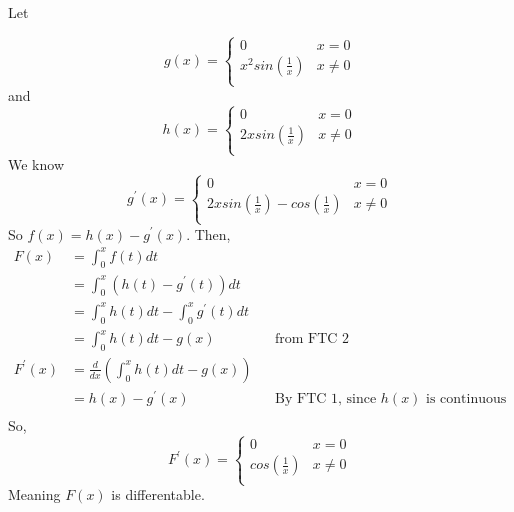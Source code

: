 \documentclass{article}
\begin{document}
Let 

\[ g(x) = \begin{cases}
0 & x=0\\
x^{2}sin\left(\frac{1}{x}\right) & x \neq 0\\
\end{cases}
 \]
and 
\[h(x) = \begin{cases}
0 & x=0\\
2xsin \left(\frac{1}{x}\right) & x \neq 0\\
\end{cases}
\]
We know
\[ g^{\prime}(x) = \begin{cases}
0 & x=0\\
2xsin\left(\frac{1}{x}\right) - cos\left(\frac{1}{x}\right) & x \neq 0\\
\end{cases}
 \]
So $f(x) = h(x) - g^{\prime}(x)$. Then,
\begin{align*}
F(x) &= \int_{0}^{x} f(t) dt\\
&= \int_{0}^{x} (h(t) - g^{\prime}(t)) dt\\
&= \int_{0}^{x}  h(t) dt - \int_{0}^{x} g^{\prime}(t)dt\\
&= \int_{0}^{x}  h(t) dt - g(x) &&\text{from FTC 2}\\
F^{\prime}(x) &= \frac{d}{dx} (\int_{0}^{x}  h(t) dt - g(x))\\
&= h(x) - g^{\prime}(x) && \text{By FTC 1, since $h(x)$ is continuous}\\
\end{align*}
So, \[ F^{\prime}(x) = \begin{cases} 
	0 & x=0\\
	cos\left(\frac{1}{x}\right) & x\neq0\\
	\end{cases}
	\]
Meaning $F(x)$ is differentable.
\end{document}
